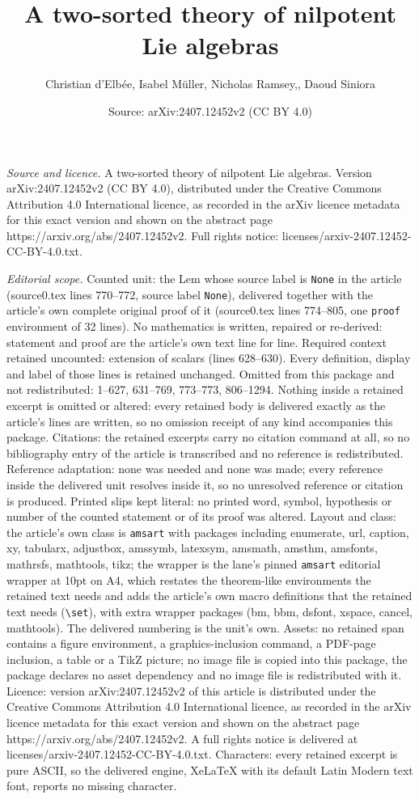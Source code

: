 \documentclass[10pt,a4paper]{amsart}
\title[A two-sorted theory of nilpotent Lie algebras]{A two-sorted theory of nilpotent Lie algebras}
\author{Christian d'Elb\'ee, Isabel M\"uller, Nicholas Ramsey,, Daoud Siniora}
\date{Source: arXiv:2407.12452v2 (CC BY 4.0)}
\begin{document}
\maketitle

\noindent\emph{Source and licence.} A two-sorted theory of nilpotent Lie algebras. Version arXiv:2407.12452v2 (CC BY 4.0), distributed under the Creative Commons Attribution 4.0 International licence, as recorded in the arXiv licence metadata for this exact version and shown on the abstract page https://arxiv.org/abs/2407.12452v2. Full rights notice: licenses/arxiv-2407.12452-CC-BY-4.0.txt.\par\smallskip

\noindent\textit{Editorial scope.} Counted unit: the Lem whose source label is \texttt{None} in the article (source0.tex lines 770--772, source label \texttt{None}), delivered together with the article's own complete original proof of it (source0.tex lines 774--805, one \texttt{proof} environment of 32 lines). No mathematics is written, repaired or re-derived: statement and proof are the article's own text line for line. Required context retained uncounted: extension of scalars (lines 628--630). Every definition, display and label of those lines is retained unchanged. Omitted from this package and not redistributed: 1--627, 631--769, 773--773, 806--1294. Nothing inside a retained excerpt is omitted or altered: every retained body is delivered exactly as the article's lines are written, so no omission receipt of any kind accompanies this package. Citations: the retained excerpts carry no citation command at all, so no bibliography entry of the article is transcribed and no reference is redistributed. Reference adaptation: none was needed and none was made; every reference inside the delivered unit resolves inside it, so no unresolved reference or citation is produced. Printed slips kept literal: no printed word, symbol, hypothesis or number of the counted statement or of its proof was altered. Layout and class: the article's own class is \texttt{amsart} with packages including enumerate, url, caption, xy, tabularx, adjustbox, amssymb, latexsym, amsmath, amsthm, amsfonts, mathrsfs, mathtools, tikz; the wrapper is the lane's pinned \texttt{amsart} editorial wrapper at 10pt on A4, which restates the theorem-like environments the retained text needs and adds the article's own macro definitions that the retained text needs (\texttt{\textbackslash set}), with extra wrapper packages (bm, bbm, dsfont, xspace, cancel, mathtools). The delivered numbering is the unit's own. Assets: no retained span contains a figure environment, a graphics-inclusion command, a PDF-page inclusion, a table or a TikZ picture; no image file is copied into this package, the package declares no asset dependency and no image file is redistributed with it. Licence: version arXiv:2407.12452v2 of this article is distributed under the Creative Commons Attribution 4.0 International licence, as recorded in the arXiv licence metadata for this exact version and shown on the abstract page https://arxiv.org/abs/2407.12452v2. A full rights notice is delivered at licenses/arxiv-2407.12452-CC-BY-4.0.txt. Characters: every retained excerpt is pure ASCII, so the delivered engine, XeLaTeX with its default Latin Modern text font, reports no missing character.
\end{document}
